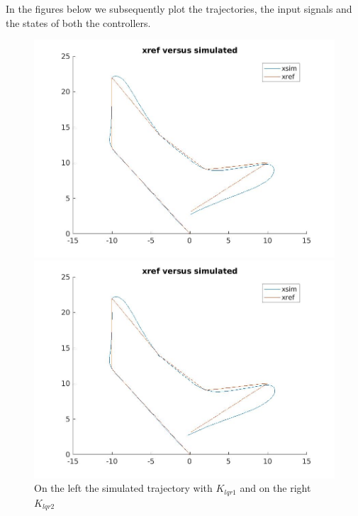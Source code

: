 \documentclass[•]{article}
\begin{document}
In the figures below we subsequently plot the trajectories, the input signals and the states of both the controllers. 
\begin{figure}[H]
\begin{minipage}{.45\textwidth}
\includegraphics[width = \textwidth]{lqr1traj.jpg}
\end{minipage}
\begin{minipage}{.45\textwidth}
\includegraphics[width = \textwidth]{lqr2traj.jpg}
\end{minipage}
\caption{On the left the simulated trajectory with $K_{lqr1}$ and on the right $K_{lqr2}$ }
\end{figure}
\end{document}
